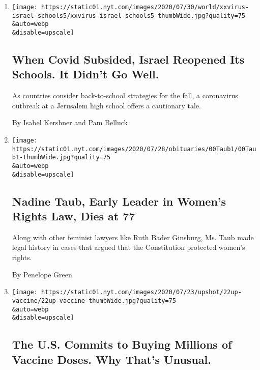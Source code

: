 \begin{enumerate}
\def\labelenumi{\arabic{enumi}.}
\item
  \href{/2020/08/04/world/middleeast/coronavirus-israel-schools-reopen.html}{}

  \texttt{[image: https://static01.nyt.com/images/2020/07/30/world/xxvirus-israel-schools5/xxvirus-israel-schools5-thumbWide.jpg?quality=75\\\&auto=webp\\\&disable=upscale]}

  \hypertarget{when-covid-subsided-israel-reopened-its-schools-it-didnt-go-well}{%
  \subsection{When Covid Subsided, Israel Reopened Its Schools. It
  Didn't Go
  Well.}\label{when-covid-subsided-israel-reopened-its-schools-it-didnt-go-well}}

  As countries consider back-to-school strategies for the fall, a
  coronavirus outbreak at a Jerusalem high school offers a cautionary
  tale.

  By Isabel Kershner and Pam Belluck
\item
  \href{/2020/07/24/us/nadine-taub-feminist-lawyer-dead.html}{}

  \texttt{[image: https://static01.nyt.com/images/2020/07/28/obituaries/00Taub1/00Taub1-thumbWide.jpg?quality=75\\\&auto=webp\\\&disable=upscale]}

  \hypertarget{nadine-taub-early-leader-in-womens-rights-law-dies-at-77}{%
  \subsection{Nadine Taub, Early Leader in Women's Rights Law, Dies at
  77}\label{nadine-taub-early-leader-in-womens-rights-law-dies-at-77}}

  Along with other feminist lawyers like Ruth Bader Ginsburg, Ms. Taub
  made legal history in cases that argued that the Constitution
  protected women's rights.

  By Penelope Green
\item
  \href{/2020/07/22/upshot/vaccine-coronavirus-government-purchase.html}{}

  \texttt{[image: https://static01.nyt.com/images/2020/07/23/upshot/22up-vaccine/22up-vaccine-thumbWide.jpg?quality=75\\\&auto=webp\\\&disable=upscale]}

  \hypertarget{the-us-commits-to-buying-millions-of-vaccine-doses-why-thats-unusual}{%
  \subsection{The U.S. Commits to Buying Millions of Vaccine Doses. Why
  That's
  Unusual.}\label{the-us-commits-to-buying-millions-of-vaccine-doses-why-thats-unusual}}


\end{enumerate}
